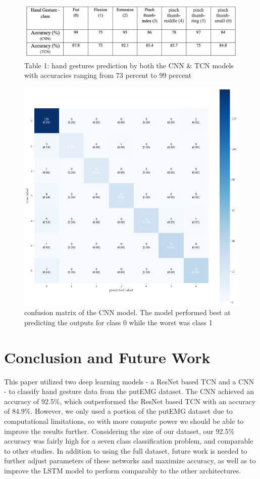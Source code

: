 \documentclass[conference]{IEEEtran}
\begin{document}
\begin{figure} \includegraphics[scale = 0.27]{Table.png}
\centering
\caption{Table 1: hand gestures prediction by both the CNN \& TCN models with accuracies ranging from 73 percent to 99 percent}
\end{figure}

\begin{figure}
\centering
\includegraphics[scale = 0.3]{CM.png}
\caption{confusion matrix of the CNN model. The model performed best at predicting the outputs for class 0 while the worst was class 1}
\end{figure}
\newline




\section{Conclusion and Future Work}
This paper utilized two deep learning models - a ResNet based TCN and a CNN - to classify hand gesture data from the putEMG dataset. The CNN achieved an accuracy of 92.5\%, which outperformed the ResNet based TCN with an accuracy of 84.9\%. However, we only used a portion of the putEMG dataset due to computational limitations, so with more compute power we should be able to improve the results further. Considering the size of our dataset, our 92.5\% accuracy was fairly high for a seven class classification problem, and comparable to other studies. In addition to using the full dataset, future work is needed to further adjust parameters of these networks and maximize accuracy, as well as to improve the LSTM model to perform comparably to the other architectures. 
\end{document}
